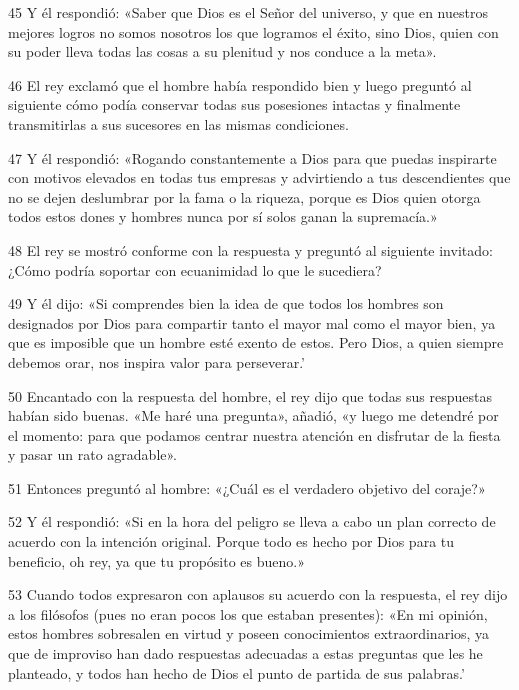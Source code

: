 \par 45 Y él respondió: «Saber que Dios es el Señor del universo, y que en nuestros mejores logros no somos nosotros los que logramos el éxito, sino Dios, quien con su poder lleva todas las cosas a su plenitud y nos conduce a la meta».

\par 46 El rey exclamó que el hombre había respondido bien y luego preguntó al siguiente cómo podía conservar todas sus posesiones intactas y finalmente transmitirlas a sus sucesores en las mismas condiciones.

\par 47 Y él respondió: «Rogando constantemente a Dios para que puedas inspirarte con motivos elevados en todas tus empresas y advirtiendo a tus descendientes que no se dejen deslumbrar por la fama o la riqueza, porque es Dios quien otorga todos estos dones y hombres nunca por sí solos ganan la supremacía.»

\par 48 El rey se mostró conforme con la respuesta y preguntó al siguiente invitado: ¿Cómo podría soportar con ecuanimidad lo que le sucediera?

\par 49 Y él dijo: «Si comprendes bien la idea de que todos los hombres son designados por Dios para compartir tanto el mayor mal como el mayor bien, ya que es imposible que un hombre esté exento de estos. Pero Dios, a quien siempre debemos orar, nos inspira valor para perseverar.'

\par 50 Encantado con la respuesta del hombre, el rey dijo que todas sus respuestas habían sido buenas. «Me haré una pregunta», añadió, «y luego me detendré por el momento: para que podamos centrar nuestra atención en disfrutar de la fiesta y pasar un rato agradable».

\par 51 Entonces preguntó al hombre: «¿Cuál es el verdadero objetivo del coraje?»

\par 52 Y él respondió: «Si en la hora del peligro se lleva a cabo un plan correcto de acuerdo con la intención original. Porque todo es hecho por Dios para tu beneficio, oh rey, ya que tu propósito es bueno.»

\par 53 Cuando todos expresaron con aplausos su acuerdo con la respuesta, el rey dijo a los filósofos (pues no eran pocos los que estaban presentes): «En mi opinión, estos hombres sobresalen en virtud y poseen conocimientos extraordinarios, ya que de improviso han dado respuestas adecuadas a estas preguntas que les he planteado, y todos han hecho de Dios el punto de partida de sus palabras.'

